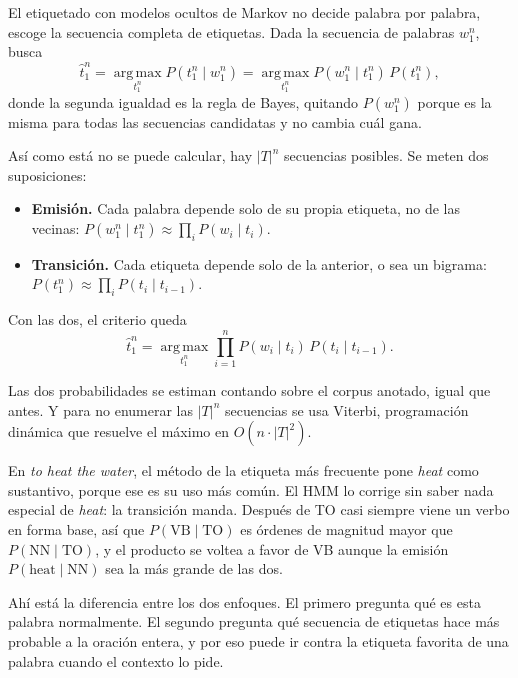 \documentclass[11pt,letterpaper]{article}
\begin{document}
El etiquetado con modelos ocultos de Markov no decide palabra por
palabra, escoge la secuencia completa de etiquetas. Dada la secuencia
de palabras $w_1^n$, busca
\[
    \hat{t}_1^n
    = \operatorname*{arg\,max}_{t_1^n} P(t_1^n \mid w_1^n)
    = \operatorname*{arg\,max}_{t_1^n} P(w_1^n \mid t_1^n)\, P(t_1^n) ,
\]
donde la segunda igualdad es la regla de Bayes, quitando $P(w_1^n)$
porque es la misma para todas las secuencias candidatas y no cambia
cuál gana.

Así como está no se puede calcular, hay $|T|^n$ secuencias posibles.
Se meten dos suposiciones:

\begin{itemize}[itemsep=0.2em]
    \item \textbf{Emisión.} Cada palabra depende solo de su propia
          etiqueta, no de las vecinas:
          $P(w_1^n \mid t_1^n) \approx \prod_i P(w_i \mid t_i)$.
    \item \textbf{Transición.} Cada etiqueta depende solo de la
          anterior, o sea un bigrama:
          $P(t_1^n) \approx \prod_i P(t_i \mid t_{i-1})$.
\end{itemize}

Con las dos, el criterio queda
\[
    \hat{t}_1^n = \operatorname*{arg\,max}_{t_1^n}
                  \prod_{i=1}^{n} P(w_i \mid t_i)\,
                                  P(t_i \mid t_{i-1}) .
\]

Las dos probabilidades se estiman contando sobre el corpus anotado,
igual que antes. Y para no enumerar las $|T|^n$ secuencias se usa
Viterbi, programación dinámica que resuelve el máximo en
$O(n \cdot |T|^2)$.

\begin{ejemplo}
    En \textit{to heat the water}, el método de la etiqueta más
    frecuente pone \textit{heat} como sustantivo, porque ese es su uso
    más común. El HMM lo corrige sin saber nada especial de
    \textit{heat}: la transición manda. Después de TO casi siempre
    viene un verbo en forma base, así que
    $P(\text{VB} \mid \text{TO})$ es órdenes de magnitud mayor que
    $P(\text{NN} \mid \text{TO})$, y el producto se voltea a favor de
    VB aunque la emisión
    $P(\text{heat} \mid \text{NN})$ sea la más grande de las dos.
\end{ejemplo}

\begin{idea}
    Ahí está la diferencia entre los dos enfoques. El primero pregunta
    qué es esta palabra normalmente. El segundo pregunta qué secuencia
    de etiquetas hace más probable a la oración entera, y por eso
    puede ir contra la etiqueta favorita de una palabra cuando el
    contexto lo pide.
\end{idea}
\end{document}
